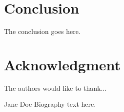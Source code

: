 \documentclass[journal]{IEEEtran}
\begin{document}
\section{Conclusion}
The conclusion goes here.


\section*{Acknowledgment}


The authors would like to thank...







\begin{IEEEbiography}{}
\end{IEEEbiography}

\begin{IEEEbiographynophoto}{}
\end{IEEEbiographynophoto}


\begin{IEEEbiographynophoto}{Jane Doe}
Biography text here.
\end{IEEEbiographynophoto}






\end{document}

